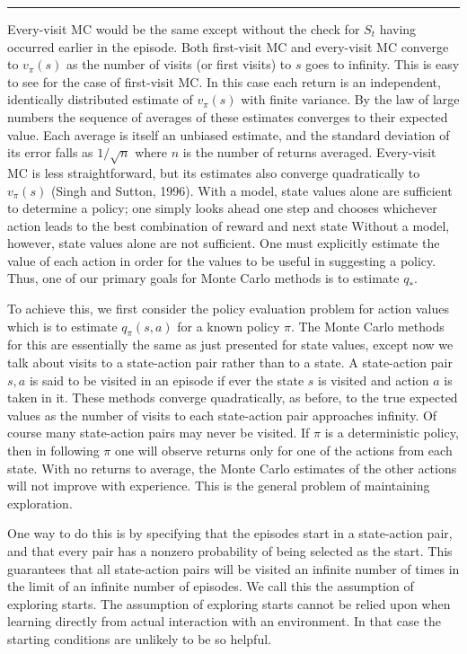 \documentclass[11pt]{article}
\theoremstyle{plain} %
\theoremstyle{remark}
\begin{document}
\vspace*{0.65em}
\hrule

 Every-visit MC would be the same except without the check for $S_{t}$
        having occurred earlier in the episode.  Both first-visit $\mathrm{MC}$ and every-visit $\mathrm{MC}$ converge
        to $v_{\pi}(s)$ as the number of visits (or first visits) to $s$ goes to
        infinity. This is easy to see for the case of first-visit MC. In this case each return is an independent, identically distributed
        estimate of $v_{\pi}(s)$ with finite variance. By the law of large numbers the sequence of averages of these
        estimates converges to their expected value. Each average is itself an unbiased estimate, and the standard
        deviation of its error falls as $1 / \sqrt{n}$ where $n$ is the number of
        returns averaged. 
Every-visit MC is less straightforward, but its estimates also
        converge quadratically to $v_{\pi}(s)$ (Singh and Sutton, 1996). With a model, state values alone are sufficient to determine a policy;
        one simply looks ahead one step and chooses whichever action leads to the
        best combination of reward and next state Without a model, however, state
        values alone are not sufficient. One must explicitly estimate the value of each action in order for the
        values to be useful in suggesting a policy. Thus, one of our primary goals for Monte Carlo methods is to estimate
        $q_{*}$.

To achieve this, we first consider the policy evaluation problem for
        action values which is to estimate $q_{\pi}(s, a)$ for a known policy $\pi$. The Monte Carlo methods for this are essentially the same as just
        presented for state values, except now we talk about visits to a
        state-action pair rather than to a state. A state-action pair $s, a$ is said to be visited in an episode if ever
        the state $s$ is visited and action $a$ is taken in it. These methods converge quadratically, as before, to the true expected
        values as the number of visits to each state-action pair approaches
        infinity. Of course many state-action pairs may never be visited. If $\pi$ is a deterministic policy, then in following $\pi$ one will
        observe returns only for one of the actions from each state. With no returns to average, the Monte Carlo estimates of the other
        actions will not improve with experience. This is the general problem of maintaining exploration.

One way to do this is by specifying that the episodes start in a
        state-action pair, and that every pair has a nonzero probability of being
        selected as the start.  This guarantees that all state-action pairs will be visited an
        infinite number of times in the limit of an infinite number of episodes. We call this the assumption of exploring starts. The assumption of exploring starts cannot be relied upon when learning
        directly from actual interaction with an environment. In that case the starting conditions are unlikely to be so helpful.
\end{document}
